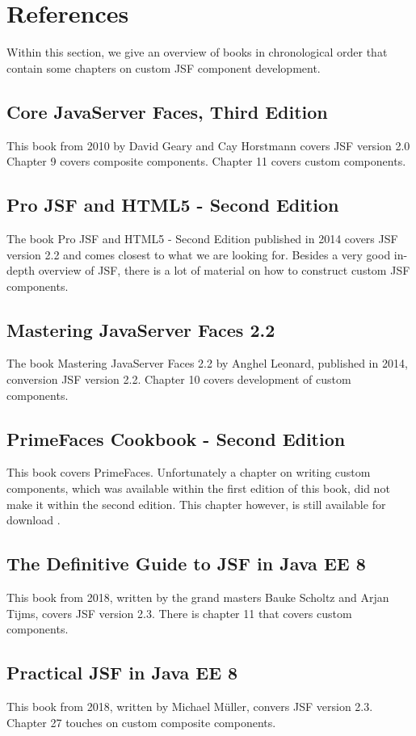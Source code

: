 %

\chapter*{References}
\label{chap:references}
Within this section, we give an overview of books in chronological order that contain some chapters on custom JSF component development.


\section*{Core JavaServer Faces, Third Edition}
This book \cite{geary2010core} from 2010 by David Geary and Cay Horstmann covers JSF version 2.0
Chapter 9 covers composite components.
Chapter 11 covers custom components.


\section*{Pro JSF and HTML5 - Second Edition}
The book Pro JSF and HTML5 - Second Edition \cite{wadia2014pro} published in 2014 covers JSF version 2.2 and comes closest to what we are looking for.
Besides a very good in-depth overview of JSF, there is a lot of material on how to construct custom JSF components.


\section*{Mastering JavaServer Faces 2.2}
The book Mastering JavaServer Faces 2.2 \cite{leonard2014mastering} by Anghel Leonard, published in 2014, conversion JSF version 2.2.
Chapter 10 covers development of custom components.
 
 
 \section*{PrimeFaces Cookbook - Second Edition}
 This book \cite{10.5555/2834507} covers PrimeFaces.
 Unfortunately a chapter on writing custom components, which was available within the first edition of this book, did not make it within the second edition.
 This chapter however, is still available for download \cite{PrimeFacesCookbookChapter11}.


\section*{The Definitive Guide to JSF in Java EE 8}
This book \cite{Scholtz2018TheDG} from 2018, written by the grand masters Bauke Scholtz and Arjan Tijms, covers JSF version 2.3.
There is chapter 11 that covers custom components.


\section*{Practical JSF in Java EE 8}
This book \cite{muller2018practicalJSF} from 2018, written by Michael Müller, convers JSF version 2.3.
Chapter 27 touches on custom composite components.



